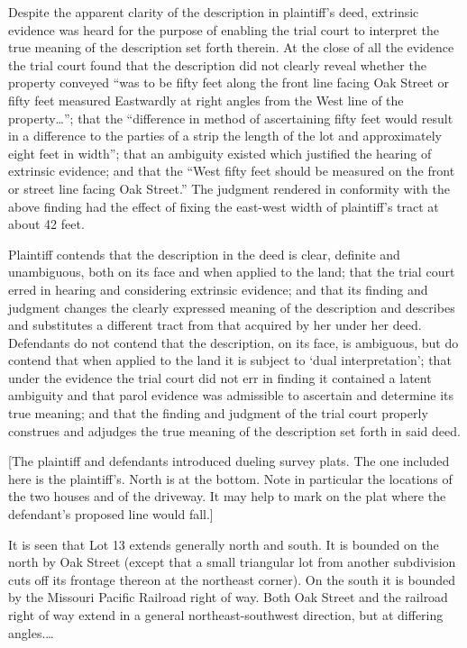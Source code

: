 Despite the apparent clarity of the description in plaintiff's deed, extrinsic
evidence was heard for the purpose of enabling the trial court to interpret the
true meaning of the description set forth therein. At the close of all the
evidence the trial court found that the description did not clearly reveal
whether the property conveyed ``was to be fifty feet along the front line facing
Oak Street or fifty feet measured Eastwardly at right angles from the West line
of the property\dots''; that the ``difference in method of ascertaining fifty
feet would result in a difference to the parties of a strip the length of the
lot and approximately eight feet in width''; that an ambiguity existed which
justified the hearing of extrinsic evidence; and that the ``West fifty feet
should be measured on the front or street line facing Oak Street.'' The judgment
rendered in conformity with the above finding had the effect of fixing the
east-west width of plaintiff's tract at about 42 feet. 

Plaintiff contends that the description in the deed is clear, definite and
unambiguous, both on its face and when applied to the land; that the trial
court erred in hearing and considering extrinsic evidence; and that its finding
and judgment changes the clearly expressed meaning of the description and
describes and substitutes a different tract from that acquired by her under her
deed. Defendants do not contend that the description, on its face, is
ambiguous, but do contend that when applied to the land it is subject to `dual
interpretation'; that under the evidence the trial court did not err in finding
it contained a latent ambiguity and that parol evidence was admissible to
ascertain and determine its true meaning; and that the finding and judgment of
the trial court properly construes and adjudges the true meaning of the
description set forth in said deed.

[The plaintiff and defendants introduced dueling survey plats. The one included
here is the plaintiff's. North is at the bottom. Note in particular the
locations of the two houses and of the driveway. It may help to mark on the
plat where the defendant's proposed line would fall.]

It is seen that Lot 13 extends generally north and south. It is bounded on the
north by Oak Street (except that a small triangular lot from another
subdivision cuts off its frontage thereon at the northeast corner). On the
south it is bounded by the Missouri Pacific Railroad right of way. Both Oak
Street and the railroad right of way extend in a general northeast-southwest
direction, but at differing angles.\ldots

